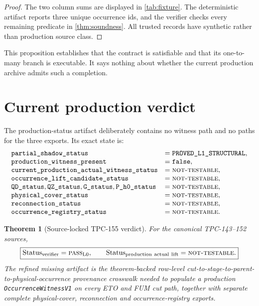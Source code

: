 \documentclass[11pt]{article}
\newtheorem{theorem}{Theorem}[section]
\numberwithin{equation}{section}
\theoremstyle{definition}
\theoremstyle{remark}
\newcommand{\Lzero}{\mathrm{L0}}
\newcommand{\NT}{\textnormal{\textsc{not-testable}}}
\newcommand{\PASS}{\textnormal{\textsc{pass}}}
\begin{document}
\begin{proof}
The two column sums are displayed in \cref{tab:fixture}.  The
deterministic artifact reports three unique occurrence ids, and the
verifier checks every remaining predicate in
\cref{thm:soundness}.  All trusted records have synthetic rather than
production source class.
\end{proof}

This proposition establishes that the contract is satisfiable and
that its one-to-many branch is executable.  It says nothing about
whether the current production archive admits such a completion.

\section{Current production verdict}

The production-status artifact deliberately contains no witness path
and no paths for the three exports.  Its exact state is:
\[
\begin{array}{ll}
\texttt{partial\_shadow\_status}
  &=\texttt{PROVED\_L1\_STRUCTURAL},\\
\texttt{production\_witness\_present} & =\texttt{false},\\
\texttt{current\_production\_actual\_witness\_status}
  &=\NT,\\
\texttt{occurrence\_lift\_candidate\_status}&=\NT,\\
\texttt{QD\_status},\texttt{QZ\_status},
\texttt{G\_status},\texttt{P\_h0\_status}&=\NT,\\
\texttt{physical\_cover\_status}&=\NT,\\
\texttt{reconnection\_status}&=\NT,\\
\texttt{occurrence\_registry\_status}&=\NT.
\end{array}
\]

\begin{theorem}[Source-locked TPC-155 verdict]
\label{thm:verdict}
For the canonical TPC-143--152 sources,
\[
 \boxed{
 \operatorname{Status}_{\rm verifier}=\PASS_{\Lzero},
 \qquad
 \operatorname{Status}_{\rm production\ actual\ lift}=\NT.}
\]
The refined missing artifact is the theorem-backed row-level
cut-to-stage-to-parent-to-physical-occurrence provenance crosswalk
needed to populate a production \texttt{OccurrenceWitnessV1} on every
ETO and FUM cut path, together with separate complete physical-cover,
reconnection and occurrence-registry exports.
\end{theorem}
\end{document}
